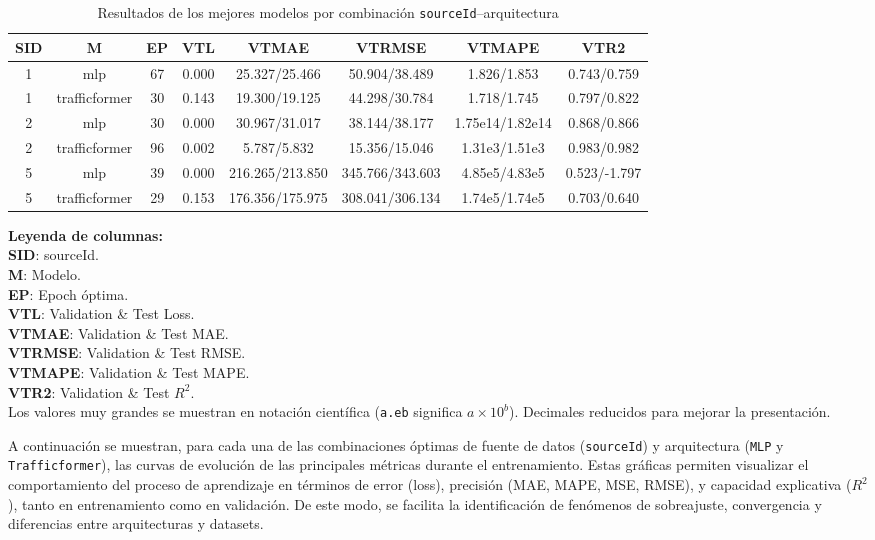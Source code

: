 \begin{table}[H]
	\centering
	\small
	\caption{Resultados de los mejores modelos por combinación \texttt{sourceId}--arquitectura}
	\label{tab:mejores_modelos}
	\begin{tabularx}{\textwidth}{c | c | c | c | c | c | c | c }
		\toprule
		\textbf{SID} & \textbf{M} & \textbf{EP} & \textbf{VTL} & \textbf{VTMAE} & \textbf{VTRMSE} & \textbf{VTMAPE} & \textbf{VTR2} \\
		\midrule
		1 & mlp           & 67 & 0.000 & 25.327/25.466 & 50.904/38.489 & 1.826/1.853 & 0.743/0.759 \\
		1 & trafficformer & 30 & 0.143 & 19.300/19.125 & 44.298/30.784 & 1.718/1.745 & 0.797/0.822 \\
		2 & mlp           & 30 & 0.000 & 30.967/31.017 & 38.144/38.177 & 1.75e14/1.82e14 & 0.868/0.866 \\
		2 & trafficformer & 96 & 0.002 & 5.787/5.832 & 15.356/15.046 & 1.31e3/1.51e3 & 0.983/0.982 \\
		5 & mlp           & 39 & 0.000 & 216.265/213.850 & 345.766/343.603 & 4.85e5/4.83e5 & 0.523/-1.797 \\
		5 & trafficformer & 29 & 0.153 & 176.356/175.975 & 308.041/306.134 & 1.74e5/1.74e5 & 0.703/0.640 \\
		\bottomrule
	\end{tabularx}
	\vspace{0.5em}
	\begin{minipage}{0.98\textwidth}
	\footnotesize
	\textbf{Leyenda de columnas:} \\
	\textbf{SID}: sourceId. \\
	\textbf{M}: Modelo. \\
	\textbf{EP}: Epoch óptima. \\
	\textbf{VTL}: Validation \& Test Loss. \\
	\textbf{VTMAE}: Validation \& Test MAE. \\
	\textbf{VTRMSE}: Validation \& Test RMSE. \\
	\textbf{VTMAPE}: Validation \& Test MAPE. \\
	\textbf{VTR2}: Validation \& Test $R^2$. \\
	Los valores muy grandes se muestran en notación científica (\texttt{a.eb} significa $a \times 10^{b}$). Decimales reducidos para mejorar la presentación.
	\end{minipage}
\end{table}


A continuación se muestran, para cada una de las combinaciones óptimas de fuente de datos (\texttt{sourceId}) y arquitectura (\texttt{MLP} y \texttt{Trafficformer}), las curvas de evolución de las principales métricas durante el entrenamiento. Estas gráficas permiten visualizar el comportamiento del proceso de aprendizaje en términos de error (loss), precisión (MAE, MAPE, MSE, RMSE), y capacidad explicativa ($R^2$), tanto en entrenamiento como en validación. De este modo, se facilita la identificación de fenómenos de sobreajuste, convergencia y diferencias entre arquitecturas y datasets.


